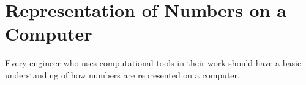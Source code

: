 \vspace{4.0cm}

\section{Representation of Numbers on a Computer}

Every engineer who uses computational tools in their work should have a basic understanding of how numbers are represented on a computer.

